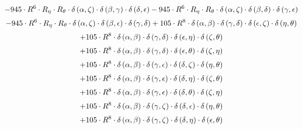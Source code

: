 \begin{subequations}
\begin{gather}
 \\[0.2em] \notag 		 - 945 \cdot R^{6} \cdot R_{\eta{}} \cdot R_{\theta{}} \cdot \delta{}\left(\alpha{}, \zeta{}\right) \cdot \delta{}\left(\beta{}, \gamma{}\right) \cdot \delta{}\left(\delta{}, \epsilon{}\right)- 945 \cdot R^{6} \cdot R_{\eta{}} \cdot R_{\theta{}} \cdot \delta{}\left(\alpha{}, \zeta{}\right) \cdot \delta{}\left(\beta{}, \delta{}\right) \cdot \delta{}\left(\gamma{}, \epsilon{}\right) 
 \\[0.2em] \notag 		 - 945 \cdot R^{6} \cdot R_{\eta{}} \cdot R_{\theta{}} \cdot \delta{}\left(\alpha{}, \zeta{}\right) \cdot \delta{}\left(\beta{}, \epsilon{}\right) \cdot \delta{}\left(\gamma{}, \delta{}\right)+ 105 \cdot R^{8} \cdot \delta{}\left(\alpha{}, \beta{}\right) \cdot \delta{}\left(\gamma{}, \delta{}\right) \cdot \delta{}\left(\epsilon{}, \zeta{}\right) \cdot \delta{}\left(\eta{}, \theta{}\right) 
 \\[0.2em] \notag 		 + 105 \cdot R^{8} \cdot \delta{}\left(\alpha{}, \beta{}\right) \cdot \delta{}\left(\gamma{}, \delta{}\right) \cdot \delta{}\left(\epsilon{}, \eta{}\right) \cdot \delta{}\left(\zeta{}, \theta{}\right) 
 \\[0.2em] \notag 		 + 105 \cdot R^{8} \cdot \delta{}\left(\alpha{}, \beta{}\right) \cdot \delta{}\left(\gamma{}, \delta{}\right) \cdot \delta{}\left(\epsilon{}, \theta{}\right) \cdot \delta{}\left(\zeta{}, \eta{}\right) 
 \\[0.2em] \notag 		 + 105 \cdot R^{8} \cdot \delta{}\left(\alpha{}, \beta{}\right) \cdot \delta{}\left(\gamma{}, \epsilon{}\right) \cdot \delta{}\left(\delta{}, \zeta{}\right) \cdot \delta{}\left(\eta{}, \theta{}\right) 
 \\[0.2em] \notag 		 + 105 \cdot R^{8} \cdot \delta{}\left(\alpha{}, \beta{}\right) \cdot \delta{}\left(\gamma{}, \epsilon{}\right) \cdot \delta{}\left(\delta{}, \eta{}\right) \cdot \delta{}\left(\zeta{}, \theta{}\right) 
 \\[0.2em] \notag 		 + 105 \cdot R^{8} \cdot \delta{}\left(\alpha{}, \beta{}\right) \cdot \delta{}\left(\gamma{}, \epsilon{}\right) \cdot \delta{}\left(\delta{}, \theta{}\right) \cdot \delta{}\left(\zeta{}, \eta{}\right) 
 \\[0.2em] \notag 		 + 105 \cdot R^{8} \cdot \delta{}\left(\alpha{}, \beta{}\right) \cdot \delta{}\left(\gamma{}, \zeta{}\right) \cdot \delta{}\left(\delta{}, \epsilon{}\right) \cdot \delta{}\left(\eta{}, \theta{}\right) 
 \\[0.2em] \notag 		 + 105 \cdot R^{8} \cdot \delta{}\left(\alpha{}, \beta{}\right) \cdot \delta{}\left(\gamma{}, \zeta{}\right) \cdot \delta{}\left(\delta{}, \eta{}\right) \cdot \delta{}\left(\epsilon{}, \theta{}\right) 

\end{gather}
\end{subequations}
